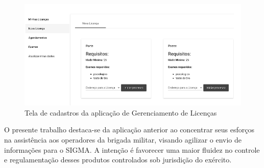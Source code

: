 \begin{figure}[htb]
    \caption{\label{fig:grafico-sglppa} Tela de cadastros da aplicação de Gerenciamento de Licenças}
    \begin{center}
        \includegraphics[scale=0.8]{imagens/sglppa.png}
    \end{center}
\end{figure}

O presente trabalho destaca-se da aplicação anterior ao concentrar seus esforços na assistência aos operadores da brigada militar, visando agilizar o envio de informações para o SIGMA. A intenção é favorecer uma maior fluidez no controle e regulamentação desses produtos controlados sob jurisdição do exército.

